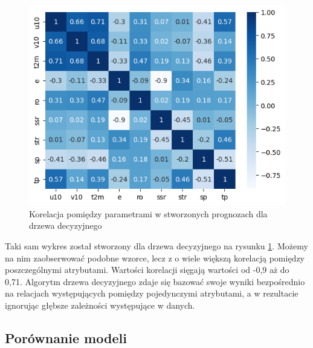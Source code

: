 \begin{figure}[H]
    \centering
    \includegraphics[width=\textwidth]{images/dt_corr_matrix.png}
    \caption{Korelacja pomiędzy parametrami w stworzonych prognozach dla drzewa decyzyjnego}
    \label{dt-corr-matrix}
\end{figure}

Taki sam wykres został stworzony dla drzewa decyzyjnego na rysunku \ref{dt-corr-matrix}. Możemy na nim 
zaobserwować podobne wzorce, lecz z o wiele większą korelacją pomiędzy poszczególnymi atrybutami. 
Wartości korelacji sięgają wartości od -0,9 aż do 0,71. Algorytm drzewa decyzyjnego zdaje się 
bazować swoje wyniki bezpośrednio na relacjach występujących pomiędzy pojedynczymi atrybutami,
a w rezultacie ignorując głębsze zależności występujące w danych.



\subsection{Porównanie modeli}

